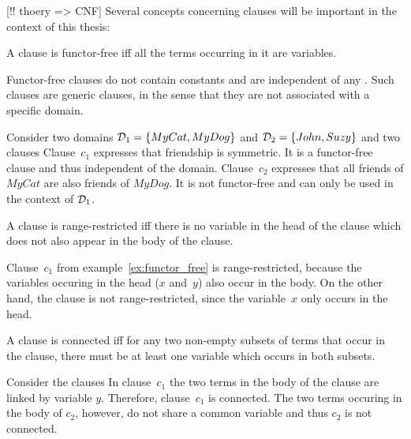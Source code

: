[!! thoery => CNF] Several concepts concerning clauses will be important in the context of this thesis:
\begin{definition}
A clause is functor-free iff all the terms occurring in it are variables.
\end{definition}
Functor-free clauses do not contain constants and are independent of any . Such clauses are generic clauses, in the sense that they are not associated with a specific domain.
\begin{ex}
\label{ex:functor_free}
Consider two domains $\mathcal{D}_1 = \{MyCat, MyDog\}$ and $\mathcal{D}_2 = \{John, Suzy\}$ and two clauses 
Clause~$c_1$ expresses that friendship is symmetric. It is a functor-free clause and thus independent of the domain. Clause~$c_2$ expresses that all friends of $MyCat$ are also friends of $MyDog$. It is not functor-free and can only be used in the context of $\mathcal{D}_1$. 
\end{ex}

\begin{definition}
A clause is range-restricted iff there is no variable in the head of the clause which does not also appear in the body of the clause.
\end{definition}

\begin{ex}
Clause~$c_1$ from example~\ref{ex:functor_free} is range-restricted, because the variables occuring in the head ($x$ and~$y$) also occur in the body. On the other hand, the clause  is not range-restricted, since the variable~$x$ only occurs in the head.
\end{ex}

\begin{definition}
A clause is connected iff for any two non-empty subsets of terms that occur in the clause, there must be at least one variable which occurs in both subsets.
\end{definition}

\begin{ex}
Consider the clauses  In clause~$c_1$ the two terms in the body of the clause are linked by variable $y$. Therefore, clause~$c_1$ is connected. The two terms occuring in the body of $c_2$, however, do not share a common variable and thus $c_2$ is not connected.
\end{ex}

